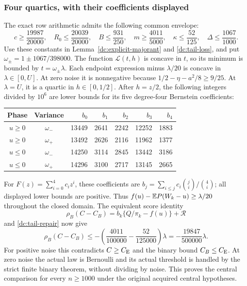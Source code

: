 \subsubsection{Four quartics, with their coefficients displayed}
The exact row arithmetic admits the following common envelope:
\[
 c\ge\frac{19987}{20000},\quad R_0\le\frac{20039}{20000},\quad
 B\le\frac{931}{250},\quad m\ge\frac{4011}{5000},\quad
 \kappa\le\frac{52}{125},\quad\Delta\le\frac{1067}{1000}.
\]
Use these constants in Lemma~\ref{dc:explicit-majorant} and
\eqref{dc:tail-loss}, and put $\omega_\pm=1\pm1067/398000$.
The function $\mathcal L(t,h)$ is concave in $t$, so its minimum is bounded
by $t=\omega_\pm\lambda$. Each endpoint expression minus $\lambda/20$
is concave in $\lambda\in[0,U]$. At zero noise it is nonnegative because
$1/2-\eta-a^2/8\ge9/25$. At $\lambda=U$, it is a quartic in
$h\in[0,1/2]$.
After $h=z/2$, the following integers divided by $10^6$ are lower bounds
for its five degree-four Bernstein coefficients:
\begin{center}
\begin{tabular}{ccrrrrr}\toprule
Phase&Variance&$b_0$&$b_1$&$b_2$&$b_3$&$b_4$\\\midrule
$u\ge0$&$\omega_-$&13449&2641&2242&12252&1883\\
$u\ge0$&$\omega_+$&13492&2626&2116&11962&1377\\
$u\le0$&$\omega_-$&14250&3114&2845&13442&3186\\
$u\le0$&$\omega_+$&14296&3100&2717&13145&2665\\\bottomrule
\end{tabular}
\end{center}
For $F(z)=\sum_{i=0}^4c_i z^i$, these coefficients are
$b_j=\sum_{i\le j}c_i\binom ji/\binom4i$; all displayed lower bounds
are positive. Thus $f(u)-\mathbb E P(W_k-u)\ge\lambda/20$ throughout the
closed domain. The equivalent score identity
\[
 \rho_B(C-C_B)=b_k\{Q/\pi_k-f(u)\}+\mathcal R
\]
and \eqref{dc:tail-repair} now give
\begin{equation}\label{dc:tail-final}
 \rho_B(C-C_B)\le-\left(\frac{4011}{100000}-\frac{52}{125000}\right)\lambda
                 =-\frac{19847}{500000}\lambda.
\end{equation}
For positive noise this contradicts $C\ge C_{\mathrm E}$ and the binary bound
$C_B\le C_{\mathrm E}$. At zero noise the actual law is Bernoulli and its actual
threshold is handled by the strict finite binary theorem, without dividing
by noise. This proves the central comparison for every $n\ge1000$ under
the original acquired central hypotheses.

